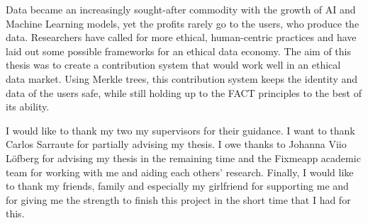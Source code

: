 \documentclass[english, 12pt, a4paper, sci, utf8, a-2b, online]{aaltothesis}
\date{29 May 2026}
\theoremstyle{change}
\theoremstyle{theoremstyle}
\begin{document}
\makecoverpage

\makecopyrightpage

\clearpage

\begin{abstractpage}[english]
Data became an increasingly sought-after commodity with the growth of AI and Machine Learning models, yet the profits rarely go to the users, who produce the data. Researchers have called for more ethical, human-centric practices and have laid out some possible frameworks for an ethical data economy. The aim of this thesis was to create a contribution system that would work well in an ethical data market. Using Merkle trees, this contribution system keeps the identity and data of the users safe, while still holding up to the FACT principles to the best of its ability.
\end{abstractpage}


\newpage


\dothesispagenumbering{}

I would like to thank my two my supervisors for their guidance. I want to thank Carlos Sarraute for partially advising my thesis. I owe thanks to Johanna Viio Löfberg for advising my thesis in the remaining time and the Fixmeapp academic team for working with me and aiding each others' research.
Finally, I would like to thank my friends, family and especially my girlfriend for supporting me and for giving me the strength to finish this project in the short time that I had for this.
\end{document}
